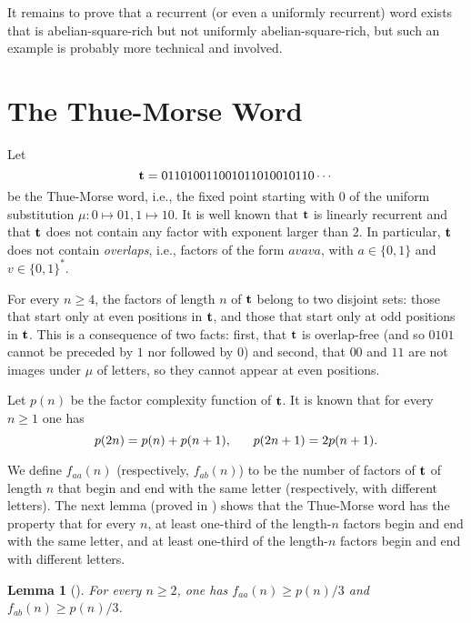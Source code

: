 \documentclass[11pt,reqno]{amsart}
\numberwithin{equation}{section}
\theoremstyle{plain}
\newtheorem{lemma}[theorem]{Lemma}
\theoremstyle{definition}
\theoremstyle{remark}
\begin{document}
It remains to prove that a  recurrent (or even a uniformly recurrent) word exists that is abelian-square-rich but not uniformly abelian-square-rich, but such an example is probably more technical and involved.

\section{The Thue-Morse Word}

Let 
\[
{\bf t} =011010011001011010010110\cdots
\]
be the Thue-Morse word, i.e., the fixed point starting with $0$ of the uniform substitution $\mu:0\mapsto 01,1\mapsto 10$. It is well known that $\bf t$ is linearly recurrent and that $\bf t$ does not contain any factor with exponent larger than $2$. In particular, $\bf t$ does not contain \emph{overlaps}, i.e., factors of the form $avava$, with $a\in \{0,1\}$ and $v\in \{0,1\}^*$.

For every $n\geq 4$, the factors of length $n$ of $\bf t$ belong to two disjoint sets: those that start only at even positions in $\bf t$, and those that start only at odd positions in $\bf t$. 
This is a consequence of two facts:  first, that $\bf t$ is overlap-free  (and so $0101$ cannot be preceded by $1$ nor followed by $0$) and second, that $00$ and $11$ are not images under $\mu$ of letters, so they cannot appear at even positions.

Let $p(n)$ be the factor complexity function of $\bf t$. It is known \cite[Proposition 4.3]{Br89} that for every $n\geq 1$ one has 
\begin{equation}\label{eq:tm}
 p(2n)=p(n)+p(n+1), \hspace{6mm} p(2n+1)=2p(n+1).
\end{equation}


We define  $f_{aa}(n)$ (respectively, $f_{ab}(n)$) to be the number of factors of $\bf t$ of length $n$ that begin and end with the same letter (respectively, with different letters).
The next lemma (proved in \cite{CaFiScZa15}) shows that the Thue-Morse word has the property that for every $n$, at least one-third of the length-$n$ factors begin and end with the same letter, and at least one-third of the length-$n$ factors begin and end with different letters. 

\begin{lemma}[\protect{\kern-0.3em}\cite{CaFiScZa15}]
\label{lem:third}
For every $n\geq 2$,
one has $f_{aa}(n)\geq  p(n)/3$ and $f_{ab}(n)\geq  p(n)/3$.
\end{lemma}
\end{document}
